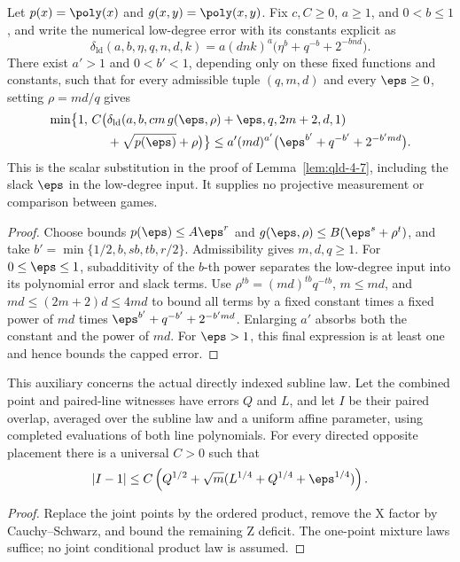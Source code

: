\begin{theorem}
	\label{thm:qld-global-pair-error-bound}
	\leanok
	Let $p(x)=\poly(x)$ and $g(x,y)=\poly(x,y)$.
	Fix $c,C\ge0$, $a\ge1$, and $0<b\le1$, and write the numerical
	low-degree error with its constants explicit as
	\[
		\delta_{\mathrm{ld}}(a,b,\eta,q,n,d,k)
		=a(dnk)^a\bigl(\eta^b+q^{-b}+2^{-bnd}\bigr).
	\]
	There exist $a'>1$ and $0<b'<1$, depending only on these fixed
	functions and constants, such that for every admissible tuple
	$(q,m,d)$ and every $\eps\ge0$, setting $\rho=md/q$ gives
	\[
		\begin{split}
		\min\bigl\{1,\,
			C\bigl(&\delta_{\mathrm{ld}}
				(a,b,cm\,g(\eps,\rho)+\eps,q,2m+2,d,1)\\
				&+\sqrt{p(\eps)}+\rho\bigr)\bigr\}
		\le a'(md)^{a'}
			\bigl(\eps^{b'}+q^{-b'}+2^{-b'md}\bigr).
		\end{split}
	\]
	This is the scalar substitution in the proof of
	Lemma~\ref{lem:qld-4-7}, including the slack $\eps$ in the
	low-degree input. It supplies no projective measurement or comparison
	between games.
\end{theorem}
\begin{proof}
	\leanok
	Choose bounds $p(\eps)\le A\eps^r$ and
	$g(\eps,\rho)\le B(\eps^s+\rho^t)$, and take
	$b'=\min\{1/2,b,sb,tb,r/2\}$. Admissibility gives $m,d,q\ge1$.
	For $0\le\eps\le1$, subadditivity of the $b$-th power separates the
	low-degree input into its polynomial error and slack terms. Use
	$\rho^{tb}=(md)^{tb}q^{-tb}$, $m\le md$, and
	$md\le(2m+2)d\le4md$ to bound all terms by a fixed constant times
	a fixed power of $md$ times
	$\eps^{b'}+q^{-b'}+2^{-b'md}$. Enlarging $a'$ absorbs both the
	constant and the power of $md$. For $\eps>1$, this final expression
	is at least one and hence bounds the capped error.
\end{proof}

\begin{theorem}
\label{thm:qld-direct-line-real-overlap}
\leanok
{}
This auxiliary concerns the actual directly indexed subline law. Let the
combined point and paired-line witnesses have errors $Q$ and $L$, and let
$I$ be their paired overlap, averaged over the subline law and a uniform
affine parameter, using completed evaluations of both line polynomials.
For every directed opposite placement there is a universal $C>0$ such that
\[
 |I-1|\leq C\left(Q^{1/2}+\sqrt m
   (L^{1/4}+Q^{1/4}+\eps^{1/4})\right).
\]
\end{theorem}
\begin{proof}
\leanok
{}
Replace the joint points by the ordered product, remove the X factor by
Cauchy--Schwarz, and bound the remaining Z deficit. The one-point mixture
laws suffice; no joint conditional product law is assumed.
\end{proof}

